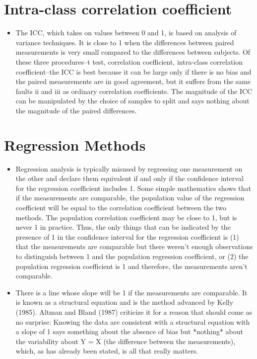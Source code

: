 \documentclass[12pt, a4paper]{report}
\theoremstyle{plain}
\theoremstyle{definition}
\theoremstyle{remark}
\begin{document}
	\section*{Intra-class correlation coefficient}
	\begin{itemize}
		\item The ICC, which takes on values between 0 and 1, is based on analysis of variance techniques. It is close to 1 when the differences between paired measurements is very small compared to the differences between subjects. Of these three procedures--t test, correlation coefficient, intra-class correlation coefficient--the ICC is best because it can be large only if there is no bias and the paired measurements are in good agreement, but it suffers from the same faults ii and iii as ordinary correlation coefficients. The magnitude of the ICC can be manipulated by the choice of samples to split and says nothing about the magnitude of the paired differences.
	\end{itemize}

	\section*{Regression Methods}
	\begin{itemize}
		\item Regression analysis is typically misused by regressing one measurement on the other and declare them equivalent if and only if the confidence interval for the regression coefficient includes 1. Some simple mathematics shows that if the measurements are comparable, the population value of the regression coefficient will be equal to the correlation coefficient between the two methods. 
		The population correlation coefficient may be close to 1, but is never 1 in practice. Thus, the only things that can be indicated by the presence of 1 in the confidence interval for the regression coefficient is (1) that the measurements are comparable but there weren't enough observations to distinguish between 1 and the population regression coefficient, or (2) the population regression coefficient is 1 and therefore, the measurements aren't comparable.
		
		\item There is a line whose slope will be 1 if the measurements are comparable. It is known as a structural equation and is the method advanced by Kelly (1985). Altman and Bland (1987) criticize it for a reason that should come as no surprise: Knowing the data are consistent with a structural equation with a slope of 1 says something about the absence of bias but *nothing* about the variability about Y = X (the difference between the measurements), which, as has already been stated, is all that really matters.
	\end{itemize}
\end{document}
